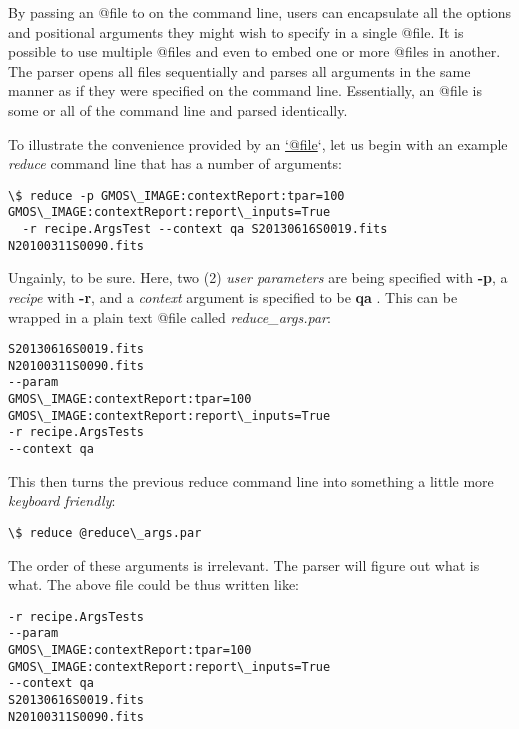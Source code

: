 \documentclass[letterpaper,10pt,english]{sphinxmanual}
\begin{document}
By passing an @file to  on the command line, users can encapsulate all
the options and positional arguments they might wish to specify in a single
@file. It is possible to use multiple @files and even to embed one or more
@files in another. The parser opens all files sequentially and parses
all arguments in the same manner as if they were specified on the command line.
Essentially, an @file is some or all of the command line and parsed identically.

To illustrate the convenience provided by an \href{mailto:'@file}{`@file}`, let us begin with an
example \emph{reduce} command line that has a number of arguments:

\begin{Verbatim}[commandchars=\\\{\}]
\$ reduce -p GMOS\_IMAGE:contextReport:tpar=100 GMOS\_IMAGE:contextReport:report\_inputs=True
  -r recipe.ArgsTest --context qa S20130616S0019.fits N20100311S0090.fits
\end{Verbatim}

Ungainly, to be sure. Here, two (2) \emph{user parameters} are being specified
with \textbf{-p}, a \emph{recipe} with \textbf{-r}, and a \emph{context} argument is specified
to be \textbf{qa} . This can be wrapped in a plain text @file called
\emph{reduce\_args.par}:

\begin{Verbatim}[commandchars=\\\{\}]
S20130616S0019.fits
N20100311S0090.fits
--param
GMOS\_IMAGE:contextReport:tpar=100
GMOS\_IMAGE:contextReport:report\_inputs=True
-r recipe.ArgsTests
--context qa
\end{Verbatim}

This then turns the previous reduce command line into something a little more
\emph{keyboard friendly}:

\begin{Verbatim}[commandchars=\\\{\}]
\$ reduce @reduce\_args.par
\end{Verbatim}

The order of these arguments is irrelevant. The parser will figure out what is
what. The above file could be thus written like:

\begin{Verbatim}[commandchars=\\\{\}]
-r recipe.ArgsTests
--param
GMOS\_IMAGE:contextReport:tpar=100
GMOS\_IMAGE:contextReport:report\_inputs=True
--context qa
S20130616S0019.fits
N20100311S0090.fits
\end{Verbatim}
\end{document}
